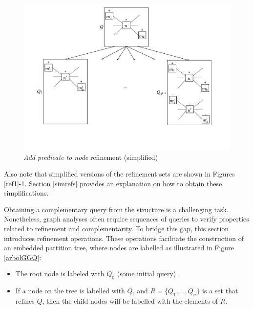 \documentclass[mathematics,article,submit,pdftex,moreauthors]{Definitions/mdpi}
\begin{document}
\begin{figure}[h]
    \begin{center}
        \includegraphics[width=\columnwidth]{png/REF4SIM.pdf}
    \end{center}
    \caption{%
        \textit{Add predicate to node} refinement (simplified)
    }%
    \label{ref4}
\end{figure}

Also note that simplified versions of the refinement sets are shown in Figures \ref{ref1}-\ref{ref4}. Section \ref{simrefs} provides an explanation on how to obtain these simplifications.

Obtaining a complementary query from the structure is a challenging task. Nonetheless, graph analyses often require sequences of queries to verify properties related to refinement and complementarity. To bridge this gap, this section introduces refinement operations. These operations facilitate the construction of an embedded partition tree, where nodes are labelled as illustrated in Figure \ref{arbolGGQ}:

\begin{itemize}
    \item The root node is labeled with $ Q_0 $ (some initial query).
    \item If a node on the tree is labelled with $Q$, and $R=\{Q_1,\dots,Q_n\}$ is a set that refines $Q$, then the child nodes will be labelled with the elements of $R$.
\end{itemize}
\end{document}
